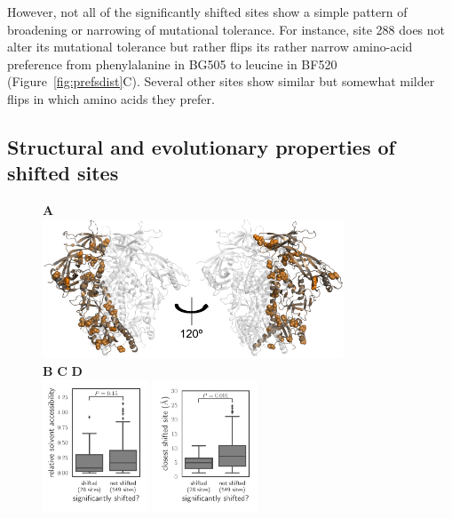 \documentclass[9pt]{elife}
\begin{document}
However, not all of the significantly shifted sites show a simple pattern of broadening or narrowing of mutational tolerance.
For instance, site 288 does not alter its mutational tolerance but rather flips its rather narrow amino-acid preference from phenylalanine in BG505 to leucine in BF520 (Figure~\ref{fig:prefsdist}C).
Several other sites show similar but somewhat milder flips in which amino acids they prefer.

\subsection{Structural and evolutionary properties of shifted sites}

\begin{figure}
{\bf \Large A} \\
\includegraphics[width=0.8\textwidth]{figures/shifts_on_structure/shifts_on_structure.pdf}
\\
{\bf \Large B} \hspace{0.28\textwidth} {\bf \Large C} \hspace{0.28\textwidth} {\bf \Large D} \\
\includegraphics[width=0.28\textwidth]{figures/rsa_vs_shifts.pdf}
\hspace{0.01\textwidth}
\includegraphics[width=0.28\textwidth]{figures/shifts_proximity.pdf}

\end{figure}
\end{document}
